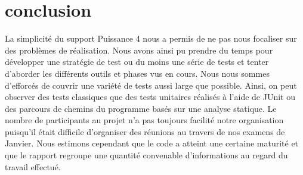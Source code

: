 
\section{conclusion}


La simplicité du support Puissance 4 nous a permis de ne pas nous focaliser sur des problèmes de réalisation. Nous avons ainsi pu prendre du temps pour développer une stratégie de test ou du moins une série de tests et tenter d'aborder les différents outils et phases vus en cours. Nous nous sommes d'efforcés de couvrir une variété de tests aussi large que possible. Ainsi, on peut observer des tests classiques que des tests unitaires réalisés à l'aide de JUnit ou des parcours de chemins du programme basés sur une analyse statique. Le nombre de participants au projet n'a pas toujours facilité notre organisation puisqu'il était difficile d'organiser des réunions au travers de nos examens de Janvier. Nous estimons cependant que le code a atteint une certaine maturité et que le rapport regroupe une quantité convenable d'informations au regard du travail effectué.
